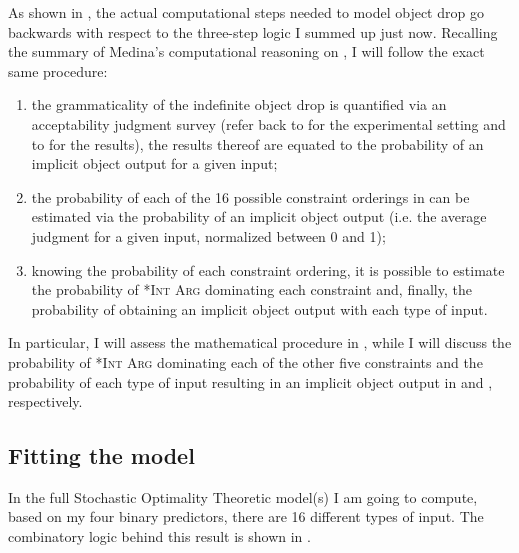As shown in , the actual computational steps needed to model object drop go backwards with respect to the three-step logic I summed up just now. Recalling the summary of Medina's computational reasoning on , I will follow the exact same procedure:
\begin{enumerate}
    \item the grammaticality of the indefinite object drop is quantified via an acceptability judgment survey (refer back to  for the experimental setting and to  for the results), the results thereof are equated to the probability of an implicit object output for a given input;
    \item the probability of each of the 16 possible constraint orderings in  can be estimated via the probability of an implicit object output (i.e. the average judgment for a given input, normalized between 0 and 1);
    \item knowing the probability of each constraint ordering, it is possible to estimate the probability of \textsc{*Int Arg} dominating each constraint and, finally, the probability of obtaining an implicit object output with each type of input.
\end{enumerate}

In particular, I will assess the mathematical procedure in , while I will discuss the probability of \textsc{*Int Arg} dominating each of the other five constraints and the probability of each type of input resulting in an implicit object output in  and , respectively.


\subsection{Fitting the model} 

In the full Stochastic Optimality Theoretic model(s) I am going to compute, based on my four binary predictors, there are 16 different types of input. The combinatory logic behind this result is shown in .

